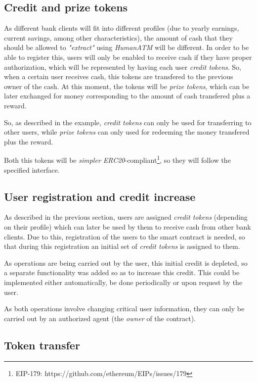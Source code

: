 \documentclass[a4paper]{article}
\begin{document}
\subsection{Credit and prize tokens}

As different bank clients will fit into different profiles (due to yearly earnings, current savings, among other characteristics), the amount of cash that they should be allowed to \textit{"extract"} using \textit{HumanATM} will be different. In order to be able to register this, users will only be enabled to receive cash if they have proper authorization, which will be represented by having each user \textit{credit tokens}. So, when a certain user receives cash, this tokens are transfered to the previous owner of the cash. At this moment, the tokens will be \textit{prize tokens}, which can be later exchanged for money corresponding to the amount of cash transfered plus a reward.

So, as described in the example, \textit{credit tokens} can only be used for transferring to other users, while \textit{prize tokens} can only used for redeeming the money transfered plus the reward.

Both this tokens will be \textit{simpler ERC20}-compliant\footnote{EIP-179: https://github.com/ethereum/EIPs/issues/179}, so they will follow the specified interface.

\subsection{User registration and credit increase}

As described in the previous section, users are assigned \textit{credit tokens} (depending on their profile) which can later be used by them to receive cash from other bank clients. Due to this, registration of the users to the smart contract is needed, so that during this registration an initial set of \textit{credit tokens} is assigned to them.

As operations are being carried out by the user, this initial credit is depleted, so a separate functionality was added so as to increase this credit. This could be implemented either automatically, be done periodically or upon request by the user.

As both operations involve changing critical user information, they can only be carried out by an authorized agent (the \textit{owner} of the contract).

\subsection{Token transfer}
\end{document}
